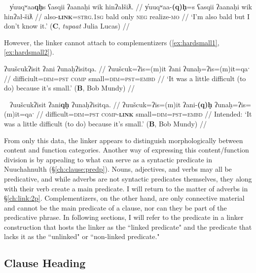 \ex~ \label{ex:alsobald}
\begingl
\glpreamble y̓uuqʷaa\textbf{qḥ}s ʕasqii ʔaanaḥi wik hinʔałšiƛ. //
\gla y̓uuqʷaa-\textbf{(q)ḥ}=s ʕasqii ʔaanaḥi wik hinʔał-šiƛ //
\glb also-\textbf{\textsc{link}}=\textsc{strg.1sg} bald only \textsc{neg} realize-\textsc{mo} //
\glft `I'm also bald but I don't know it.' (\textbf{C}, \textit{tupaat} Julia Lucas) //
\endgl
\xe

However, the linker cannot attach to complementizers (\ref{ex:hardsmall1}, \ref{ex:hardsmall2}).

\ex \label{ex:hardsmall1}
\begingl
\glpreamble ʔuušcukʔisit ʔani ʔunaḥʔisitqa. //
\gla ʔuušcuk=ʔis=(m)it ʔani ʔunaḥ=ʔis=(m)it=qaˑ //
\glb difficiult=\textsc{dim}=\textsc{pst} \textsc{comp} small=\textsc{dim}=\textsc{pst}=\textsc{embd} //
\glft `It was a little difficult (to do) because it's small.' (\textbf{B}, Bob Mundy) //
\endgl
\xe

\ex~ \label{ex:hardsmall2}
\begingl
\glpreamble *ʔuušcukʔisit ʔani\textbf{qḥ} ʔunaḥʔisitqa. //
\gla ʔuušcuk=ʔis=(m)it ʔani-\textbf{(q)ḥ} ʔunaḥ=ʔis=(m)it=qaˑ //
\glb difficult=\textsc{dim}=\textsc{pst} \textsc{comp}-\textbf{\textsc{link}} small=\textsc{dim}=\textsc{pst}=\textsc{embd} //
\glft Intended: `It was a little difficult (to do) because it's small.' (\textbf{B}, Bob Mundy) //
\endgl
\xe

From only this data, the linker appears to distinguish morphologically between content and function categories. Another way of expressing this content/function division is by appealing to what can serve as a syntactic predicate in Nuuchahnulth (\S\ref{ch:clause:predp}). Nouns, adjectives, and verbs may all be predicative, and while adverbs are not syntactic predicates themselves, they along with their verb create a main predicate. I will return to the matter of adverbs in \S\ref{ch:link:2p}. Complementizers, on the other hand, are only connective material and cannot be the main predicate of a clause, nor can they be part of the predicative phrase. In following sections, I will refer to the predicate in a linker construction that hosts the linker as the ``linked predicate" and the predicate that lacks it as the ``unlinked" or ``non-linked predicate."


\subsection{Clause Heading} \label{ch:link:clause}

